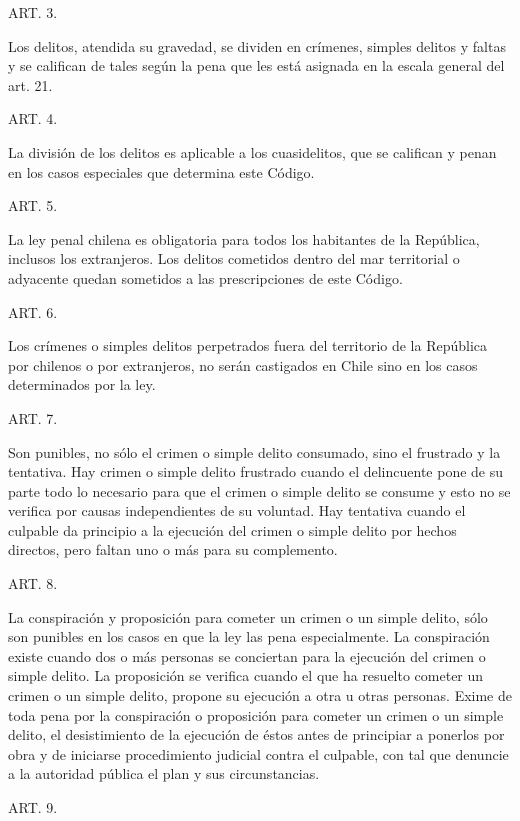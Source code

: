     ART. 3.

    Los delitos, atendida su gravedad, se dividen en crímenes, simples delitos y faltas y se califican de tales según la pena que les está asignada en la escala general del art. 21.


    ART. 4.

    La división de los delitos es aplicable a los cuasidelitos, que se califican y penan en los casos especiales que determina este Código.


    ART. 5.

    La ley penal chilena es obligatoria para todos los habitantes de la República, inclusos los extranjeros. Los delitos cometidos dentro del mar territorial o adyacente quedan sometidos a las prescripciones de este Código.


    ART. 6.

    Los crímenes o simples delitos perpetrados fuera del territorio de la República por chilenos o por extranjeros, no serán castigados en Chile sino en los casos determinados por la ley.


    ART. 7.

    Son punibles, no sólo el crimen o simple delito consumado, sino el frustrado y la tentativa.
    Hay crimen o simple delito frustrado cuando el delincuente pone de su parte todo lo necesario para que el crimen o simple delito se consume y esto no se verifica por causas independientes de su voluntad.
    Hay tentativa cuando el culpable da principio a la ejecución del crimen o simple delito por hechos directos, pero faltan uno o más para su complemento.



    ART. 8.

    La conspiración y proposición para cometer un crimen o un simple delito, sólo son punibles en los casos en que la ley las pena especialmente.
    La conspiración existe cuando dos o más personas se conciertan para la ejecución del crimen o simple delito.
    La proposición se verifica cuando el que ha resuelto cometer un crimen o un simple delito, propone su ejecución a otra u otras personas.
    Exime de toda pena por la conspiración o proposición para cometer un crimen o un simple delito, el desistimiento de la ejecución de éstos antes de principiar a ponerlos por obra y de iniciarse procedimiento judicial contra el culpable, con tal que denuncie a la autoridad pública el plan y sus circunstancias.




    ART. 9.


